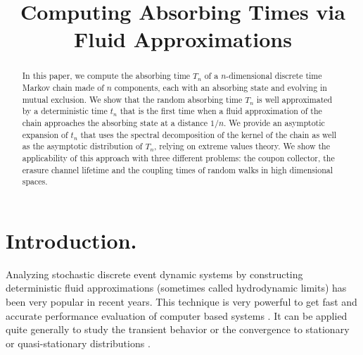 \documentclass{aptpub}
\begin{document}
\title{Computing Absorbing Times via Fluid Approximations}









\begin{abstract}

  In this paper, we compute the absorbing time $T_n$ of a
  $n$-dimensional discrete time Markov chain made of $n$ components,
  each with an absorbing state and evolving in mutual exclusion. We
  show that the random absorbing time $T_n$ is well approximated by a
  deterministic time $t_n$ that is the first time when a fluid
  approximation of the chain approaches the absorbing state at a
  distance $1/n$.  We provide an asymptotic expansion of $t_n$ that
  uses the spectral decomposition of the kernel of the chain as well
  as the asymptotic distribution of $T_n$, relying on extreme values
  theory.  We show the applicability of this approach with three
  different problems: the coupon collector, the erasure channel
  lifetime and the coupling times of random walks in high dimensional
  spaces.
\end{abstract}






\section{Introduction.}


Analyzing stochastic discrete event dynamic systems by constructing
deterministic fluid approximations (sometimes called hydrodynamic
limits) has been very popular in recent years.  This technique is very
powerful to get fast and accurate performance evaluation of computer
based systems
\cite{Leboudec2,chaintreau2009age,gast2010mean}.  It can
be applied quite generally to study the transient behavior or the
convergence to stationary or quasi-stationary distributions
\cite{Leboudec,Ramanan,Meleard}. 
\end{document}
